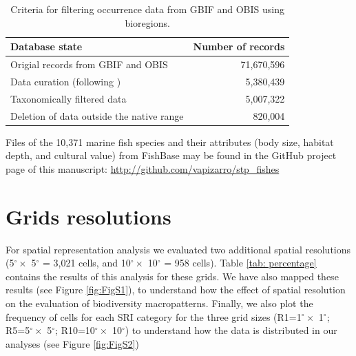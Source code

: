 \documentclass[12pt,authoryear]{elsarticle}
\begin{document}
\begin{table}[h]
\centering
\begin{tabular}{ l  r }

\textbf{Database state} & \textbf{Number of records}\\ 
  \hline
  \hline
  Origial records from GBIF and OBIS & 71,670,596 \\ 
  Data curation (following  \cite{zizka2020}) & 5,380,439\\
  Taxonomically filtered data & 5,007,322\\ 
  Deletion of data outside the native range & 820,004\\ 
  \hline
   \hline
\end{tabular}
\caption{Criteria for filtering occurrence data from GBIF and OBIS using bioregions.}
\label{tab:data cleaning}
\end{table}

Files of the 10,371 marine fish species and their attributes (body size, habitat depth, and cultural value) from FishBase may be found in the GitHub project page of this manuscript: \href{https://github.com/vapizarro/stp_fishes}{http://github.com/vapizarro/stp\_fishes}



\section{Grids resolutions}

For spatial representation analysis we evaluated two additional spatial resolutions (5$^\circ \times$ 5$^\circ$ = 3,021 cells, and 10$^\circ \times$ 10$^\circ$ = 958 cells). Table \ref{tab: percentage} contains the results of this analysis for these grids. We have also mapped these results (see Figure \ref{fig:FigS1}), to understand how the effect of spatial resolution on the evaluation of biodiversity macropatterns. Finally, we also plot the frequency of cells for each SRI category for the three grid sizes (R1=1$^\circ \times$ 1$^\circ$; R5=5$^\circ \times$ 5$^\circ$; R10=10$^\circ \times$ 10$^\circ$) to understand how the data is distributed in our analyses (see Figure \ref{fig:FigS2})
\end{document}

